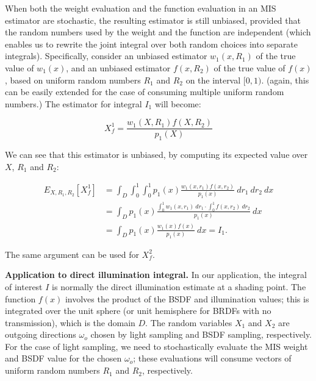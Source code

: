 
When both the weight evaluation and the function evaluation in an MIS estimator are stochastic, the resulting estimator is still unbiased, provided that the random numbers used by the weight and the function are independent (which enables us to rewrite the joint integral over both random choices into separate integrals). Specifically, consider an unbiased estimator $w_1(x,R_1)$ of the true value of $w_1(x)$, and an unbiased estimator $f(x,R_2)$ of the true value of $f(x)$, based on uniform random numbers $R_1$ and $R_2$ on the interval $[0,1)$. (again, this can be easily extended for the case of consuming multiple uniform random numbers.) The estimator for integral $I_1$ will become:

\begin{equation}
X_f^1 = \frac{w_1(X,R_1) f(X,R_2)}{p_1(X)}
\end{equation}

We can see that this estimator is unbiased, by computing its expected value over $X$, $R_1$ and $R_2$:

\begin{align}
E_{X,R_1,R_2}[X_f^1] &= \int_D \int_0^1 \int_0^1 p_1(x) \frac{w_1(x,r_1) f(x,r_2)}{p_1(x)} \ dr_1 \ dr_2 \ dx \nonumber \\
					 &= \int_D  p_1(x) \frac{\int_0^1 w_1(x,r_1) \ dr_1 \cdot \int_0^1 f(x,r_2) \ dr_2}{p_1(x)} \ dx \nonumber \\
					 &= \int_D  p_1(x) \frac{w_1(x) f(x)}{p_1(x)} \ dx = I_1.
\end{align}

The same argument can be used for $X_f^2$.



{\bf Application to direct illumination integral.} In our application, the integral of interest $I$ is normally the direct illumination estimate at a shading point. The function $f(x)$ involves the product of the BSDF and illumination values; this is integrated over the unit sphere (or unit hemisphere for BRDFs with no transmission), which is the domain $D$. The random variables $X_1$ and $X_2$ are outgoing directions $\omega_o$ chosen by light sampling and BSDF sampling, respectively. For the case of light sampling, we need to stochastically evaluate the MIS weight and BSDF value for the chosen $\omega_o$; these evaluations will consume vectors of uniform random numbers $R_1$ and $R_2$, respectively.


